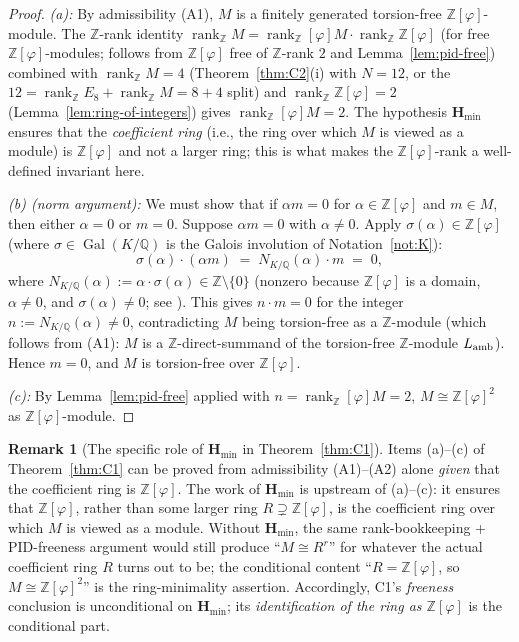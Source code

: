 \documentclass[11pt, a4paper]{amsart}
\theoremstyle{definition}
\newtheorem{remark}[theorem]{Remark}
\newcommand{\Q}{\mathbb{Q}}
\newcommand{\Z}{\mathbb{Z}}
\newcommand{\rk}{\operatorname{rank}}
\newcommand{\Gal}{\operatorname{Gal}}
\newcommand{\Hmin}{\mathbf{H}_{\min}}
\newcommand{\Ophi}{\mathbb{Z}[\varphi]}
\begin{document}
\begin{proof}
\emph{(a):} By admissibility (A1), $M$ is a finitely generated
torsion-free $\Ophi$-module. The $\Z$-rank identity
$\rk_\Z M = \rk_\Ophi M \cdot \rk_\Z \Ophi$ (for free
$\Ophi$-modules; follows from $\Ophi$ free of $\Z$-rank $2$ and
Lemma~\ref{lem:pid-free}) combined with $\rk_\Z M = 4$
(Theorem~\ref{thm:C2}(i) with $N = 12$, or the
$12 = \rk_\Z E_8 + \rk_\Z M = 8 + 4$ split) and $\rk_\Z \Ophi =
2$ (Lemma~\ref{lem:ring-of-integers}) gives $\rk_\Ophi M = 2$.
The hypothesis $\Hmin$ ensures that the \emph{coefficient ring}
(i.e., the ring over which $M$ is viewed as a module) is
$\Ophi$ and not a larger ring; this is what makes the
$\Ophi$-rank a well-defined invariant here.

\emph{(b) (norm argument):} We must show that if $\alpha m = 0$
for $\alpha \in \Ophi$ and $m \in M$, then either $\alpha = 0$
or $m = 0$. Suppose $\alpha m = 0$ with $\alpha \neq 0$. Apply
$\sigma(\alpha) \in \Ophi$ (where $\sigma \in \Gal(K/\Q)$ is
the Galois involution of Notation~\ref{not:K}):
\[
  \sigma(\alpha) \cdot (\alpha m) \;=\; N_{K/\Q}(\alpha) \cdot m
  \;=\; 0,
\]
where $N_{K/\Q}(\alpha) := \alpha \cdot \sigma(\alpha) \in \Z
\setminus \{0\}$ (nonzero because $\Ophi$ is a domain,
$\alpha \neq 0$, and $\sigma(\alpha) \neq 0$; see
\cite[Ch.~2, \S2.3]{Marcus}). This gives $n \cdot m = 0$ for the
integer $n := N_{K/\Q}(\alpha) \neq 0$, contradicting $M$ being
torsion-free as a $\Z$-module (which follows from (A1): $M$ is a
$\Z$-direct-summand of the torsion-free $\Z$-module $L_{\rm amb}$).
Hence $m = 0$, and $M$ is torsion-free over $\Ophi$.

\emph{(c):} By Lemma~\ref{lem:pid-free} applied with $n =
\rk_\Ophi M = 2$, $M \cong \Ophi^{2}$ as $\Ophi$-module.
\end{proof}

\begin{remark}[The specific role of $\Hmin$ in Theorem~\ref{thm:C1}]
\label{rmk:C1-Hmin-role}
Items (a)--(c) of Theorem~\ref{thm:C1} can be proved from
admissibility (A1)--(A2) alone \emph{given} that the coefficient
ring is $\Ophi$. The work of $\Hmin$ is upstream of (a)--(c):
it ensures that $\Ophi$, rather than some larger ring $R
\supsetneq \Ophi$, is the coefficient ring over which $M$ is
viewed as a module. Without $\Hmin$, the same rank-bookkeeping
+ PID-freeness argument would still produce ``$M \cong R^{r}$''
for whatever the actual coefficient ring $R$ turns out to be;
the conditional content ``$R = \Ophi$, so $M \cong \Ophi^2$'' is
the ring-minimality assertion. Accordingly, C1's \emph{freeness}
conclusion is unconditional on $\Hmin$; its \emph{identification
of the ring as $\Ophi$} is the conditional part.
\end{remark}
\end{document}
